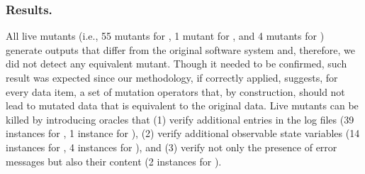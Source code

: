 



%

%


\subsubsection*{Results.} 
All live mutants (i.e., 55 mutants for \ADCS, 1 mutant for \GPS, and 4 mutants for \PARAM) generate outputs that differ from the original software system and, therefore, we did not detect any equivalent mutant. Though it needed to be confirmed, such result was expected since our methodology, if correctly applied, suggests, for every data item, a set of mutation operators that, by construction, should not lead to mutated data that is equivalent to the original data.
Live mutants can be killed by introducing oracles that (1) verify additional entries in the log files (39 instances for \ADCS, 1 instance for \GPS), (2) verify additional observable state variables (14 instances for \ADCS, 4 instances for \PARAM), and (3) verify not only the presence of error messages but also their content (2 instances for \ADCS).


